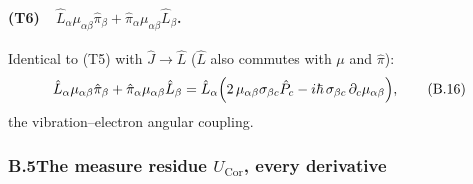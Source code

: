 \paragraph{(T6)\ \ $\hat L_\alpha\mu_{\alpha\beta}\hat\pi_\beta+\hat\pi_\alpha\mu_{\alpha\beta}\hat L_\beta$.}
Identical to (T5) with $\hat J\to\hat L$ ($\hat L$ also commutes with $\mu$ and $\hat\pi$):
\begin{equation}
\hat L_\alpha\mu_{\alpha\beta}\hat\pi_\beta+\hat\pi_\alpha\mu_{\alpha\beta}\hat L_\beta
=\hat L_\alpha\Bigl(2\,\mu_{\alpha\beta}\sigma_{\beta c}\hat P_c-i\hbar\,\sigma_{\beta c}\,\partial_c\mu_{\alpha\beta}\Bigr), \tag{B.16}
\end{equation}
the vibration--electron angular coupling.

\subsubsection*{B.5\quad The measure residue $U_{\mathrm{Cor}}$, every derivative}


